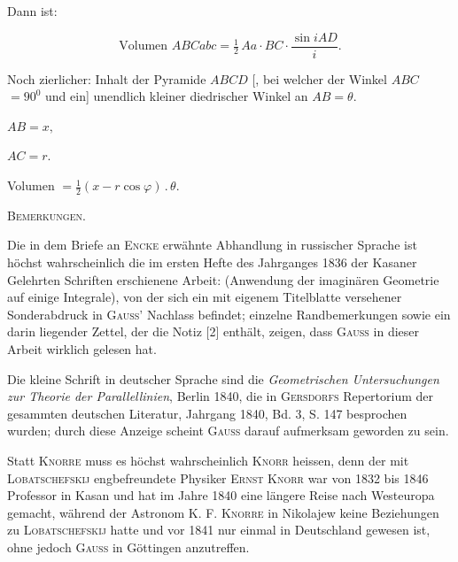 %
\par
Dann ist:

\[
\text{Volumen } ABCabc = \tfrac{1}{2}\, Aa \cdot BC \cdot \frac{\sin iAD}{i}.
\]


Noch zierlicher: Inhalt der Pyramide $ABCD$ [, bei welcher der Winkel $ABC$
$= 90^0$ und ein] unendlich kleiner diedrischer Winkel an $AB = \theta$.

\begin{center}
\begin{minipage}[b]{6.1cm}\begin{center}
$AB = x,$

$AC = r.$

Volumen $= \tfrac{1}{2}(x - r\cos\varphi)\,.\,\theta.$
\end{center}\end{minipage}\hfill
\begin{minipage}[b]{6.5cm}\end{minipage}
\end{center}

\begin{center}


\textsc{Bemerkungen.}
\end{center}


\begingroup\small
Die in dem Briefe an \textsc{Encke} erwähnte Abhandlung in russischer Sprache ist
höchst wahrscheinlich die im ersten Hefte des Jahrganges 1836 der Kasaner Gelehrten
Schriften erschienene Arbeit:  (Anwendung der imaginären Geometrie auf einige Integrale), von der sich
ein mit eigenem Titelblatte versehener Sonderabdruck in \textsc{Gauss}' Nachlass
befindet; einzelne Randbemerkungen sowie ein darin liegender Zettel, der die Notiz
[2] enthält, zeigen, dass \textsc{Gauss} in dieser Arbeit wirklich gelesen hat.


Die kleine Schrift in deutscher Sprache sind die \emph{Geometrischen Untersuchungen
zur Theorie der Parallellinien}, Berlin 1840, die in \textsc{Gersdorfs} Repertorium
der gesammten deutschen Literatur, Jahrgang 1840, Bd. 3, S. 147 besprochen wurden;
durch diese Anzeige scheint \textsc{Gauss} darauf aufmerksam geworden zu sein.


Statt \textsc{Knorre} muss es höchst wahrscheinlich \textsc{Knorr} heissen, denn der
mit \textsc{Lobatschefskij} engbefreundete Physiker \textsc{Ernst Knorr} war von 1832
bis 1846 Professor in Kasan und hat im Jahre 1840 eine längere Reise nach Westeuropa
gemacht, während der Astronom \textsc{K. F. Knorre} in Nikolajew keine Beziehungen zu
\textsc{Lobatschefskij} hatte und vor 1841 nur einmal in Deutschland gewesen ist, ohne jedoch \textsc{Gauss} in
Göttingen anzutreffen.



